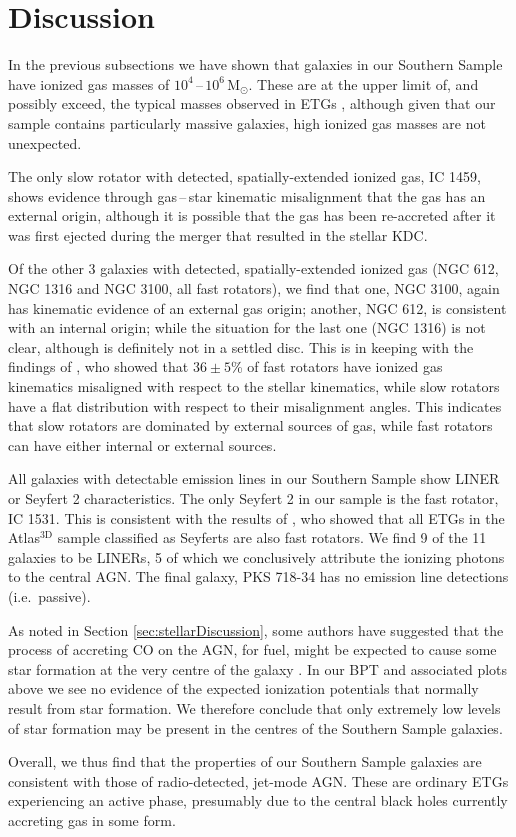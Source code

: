 

\section{Discussion}
	\label{sec:gasDiscussion}
	In the previous subsections we have shown that galaxies in our Southern Sample have ionized gas masses of $10^4$\,--\,$10^6\,\mathrm{M_\odot}$. These are at the upper limit of, and possibly exceed, the typical masses observed in ETGs \citep[e.g.][]{Phillips1986, Zeilinger1996, Sarzi2005}, although given that our sample contains particularly massive galaxies, high ionized gas masses are not unexpected. 

	The only slow rotator with detected, spatially-extended ionized gas, IC 1459, shows evidence through gas\,--\,star kinematic misalignment that the gas has an external origin, although it is possible that the gas has been re-accreted after it was first ejected during the merger that resulted in the stellar KDC. 

	Of the other 3 galaxies with detected, spatially-extended ionized gas (NGC 612, NGC 1316 and NGC 3100, all fast rotators), we find that one, NGC 3100, again has kinematic evidence of an external gas origin; another, NGC 612, is consistent with an internal origin; while the situation for the last one (NGC 1316) is not clear, although is definitely not in a settled disc. This is in keeping with the findings of \citet{Davis2011a}, who showed that $36\pm5$\% of fast rotators have ionized gas kinematics misaligned with respect to the stellar kinematics, while slow rotators have a flat distribution with respect to their misalignment angles. This indicates that slow rotators are dominated by external sources of gas, while fast rotators can have either internal or external sources. 

	All galaxies with detectable emission lines in our Southern Sample show LINER or Seyfert 2 characteristics. The only Seyfert 2 in our sample is the fast rotator, IC 1531. This is consistent with the results of \citet{Nyland2016}, who showed that all ETGs in the Atlas$^\text{3D}$ sample classified as Seyferts are also fast rotators. We find 9 of the 11 galaxies to be LINERs, 5 of which we conclusively attribute the ionizing photons to the central AGN. The final galaxy, PKS 718-34 has no emission line detections (i.e.\ passive). 

	As noted in Section \ref{sec:stellarDiscussion}, some authors have suggested that the process of accreting CO on the AGN, for fuel, might be expected to cause some star formation at the very centre of the galaxy \citep[e.g.][]{Collin1999, Diamond-Stanic2012, LaMassa2013}. In our BPT and associated plots above we see no evidence of the expected ionization potentials that normally result from star formation. We therefore conclude that only extremely low levels of star formation may be present in the centres of the Southern Sample galaxies. 

	Overall, we thus find that the properties of our Southern Sample galaxies are consistent with those of radio-detected, jet-mode AGN. These are ordinary ETGs experiencing an active phase, presumably due to the central black holes currently accreting gas in some form. 
